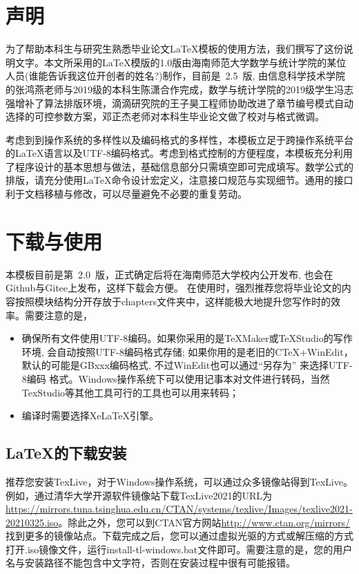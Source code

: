 \introduction

\section*{声明}
为了帮助本科生与研究生熟悉毕业论文{\LaTeX{}}模板的使用方法，我们撰写了这份说明文字。本文所采用的{\LaTeX{}}模版的1.0版由海南师范大学数学与统计学院的某位人员(谁能告诉我这位开创者的姓名?)制作，目前是~2.5~版, 由信息科学技术学院的张鸿燕老师与2019级的本科生陈潇合作完成，数学与统计学院的2019级学生冯志强增补了算法排版环境，滴滴研究院的王子昊工程师协助改进了章节编号模式自动选择的可控参数方案，邓正杰老师对本科生毕业论文做了校对与格式微调。

考虑到到操作系统的多样性以及编码格式的多样性，本模板立足于跨操作系统平台的{\LaTeX{}}语言以及UTF-8编码格式。考虑到格式控制的方便程度，本模板充分利用了程序设计的基本思想与做法，基础信息部分只需填空即可完成填写。数学公式的排版，请充分使用{\LaTeX{}}命令设计宏定义，注意接口规范与实现细节。通用的接口利于文档移植与修改，可以尽量避免不必要的重复劳动。

\section*{下载与使用}

本模板目前是第~2.0~版，正式确定后将在海南师范大学校内公开发布, 也会在Github与Gitee上发布，这样下载会方便。
在使用时，强烈推荐您将毕业论文的内容按照模块结构分开存放于chapters文件夹中，这样能极大地提升您写作时的效率。需要注意的是，
\begin{itemize}
\item 确保所有文件使用UTF-8编码。如果你采用的是TeXMaker或TeXStudio的写作环境, 会自动按照UTF-8编码格式存储;
	如果你用的是老旧的CTeX+WinEdit，默认的可能是GBxxx编码格式, 不过WinEdit也可以通过“另存为” 来选择UTF-8编码
	格式。Windows操作系统下可以使用记事本对文件进行转码，当然TexStudio等其他工具可行的工具也可以用来转码；
\item 编译时需要选择XeLaTeX引擎。
\end{itemize}

\subsection*{\LaTeX{}的下载安装}
推荐您安装TexLive，对于Windows操作系统，可以通过众多镜像站得到TexLive。例如，通过清华大学开源软件镜像站下载TexLive2021的URL为\url{https://mirrors.tuna.tsinghua.edu.cn/CTAN/systems/texlive/Images/texlive2021-20210325.iso}。除此之外，您可以到CTAN官方网站\url{http://www.ctan.org/mirrors/}找到更多的镜像站点。下载完成之后，您可以通过虚拟光驱的方式或解压缩的方式打开.iso镜像文件，运行install-tl-windows.bat文件即可。需要注意的是，您的用户名与安装路径不能包含中文字符，否则在安装过程中很有可能报错。

